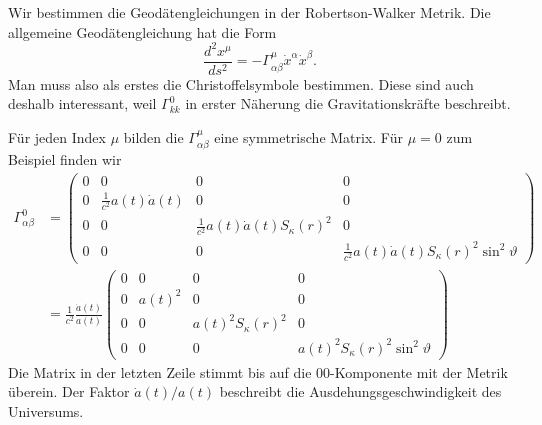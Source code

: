 Wir bestimmen die Geodätengleichungen in der Robertson-Walker Metrik.
Die allgemeine Geodätengleichung hat die Form
\[
\frac{d^2x^\mu}{ds^2} = -\Gamma^\mu_{\alpha\beta} \dot x^\alpha \dot x^\beta.
\]
Man muss also als erstes die Christoffelsymbole bestimmen.  
Diese sind auch deshalb interessant, weil $\Gamma^0_{kk}$ in erster
Näherung die Gravitationskräfte beschreibt.

Für jeden Index $\mu$ bilden die $\Gamma^\mu_{\alpha\beta}$
eine symmetrische Matrix.
Für $\mu=0$ zum Beispiel finden wir
\begin{align*}
\Gamma^0_{\alpha\beta}
&=
\begin{pmatrix}
0&0&0&0\\
0&\frac1{c^2} a(t)\dot a(t)& 0 & 0 \\
0 & 0 & \frac1{c^2}a(t)\dot a(t)S_\kappa(r)^2 & 0 \\
0 & 0 & 0 & \frac1{c^2} a(t)\dot a(t)S_\kappa(r)^2 \sin^2\vartheta
\end{pmatrix}
\\
&=
\frac1{c^2}
\frac{\dot a(t)}{a(t)}
\begin{pmatrix}
0&     0&                  0&                                 0\\
0&a(t)^2&                  0&                                 0\\
0&     0&a(t)^2S_\kappa(r)^2&                                 0\\
0&     0&                  0&a(t)^2S_\kappa(r)^2\sin^2\vartheta
\end{pmatrix}
\end{align*}
Die Matrix in der letzten Zeile stimmt bis auf die $00$-Komponente
mit der Metrik überein.
Der Faktor $\dot a(t)/a(t)$ beschreibt die Ausdehungsgeschwindigkeit
des Universums.

